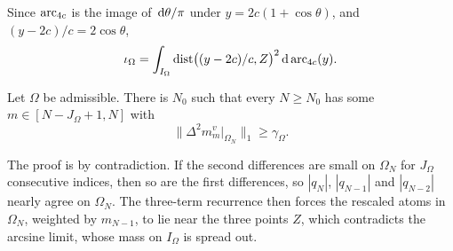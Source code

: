 Since $\operatorname{arc}_{4c}$ is the image of $\,\mathrm{d}\theta/\pi$ under $y=2c(1+\cos\theta)$, and $(y-2c)/c=2\cos\theta$,
\begin{equation}\label{eq:iota-arc}
  \iota_\Omega=\int_{I_\Omega}\operatorname{dist}\bigl((y-2c)/c,Z\bigr)^2\,\mathrm{d}\operatorname{arc}_{4c}(y).
\end{equation}

\begin{lemma}\label{lem:window}
Let $\Omega$ be admissible. There is $N_0$ such that every $N\ge N_0$ has some $m\in[N-J_\Omega+1,N]$ with
\[
  \bigl\|\Delta^2m^v_m|_{\Omega_N}\bigr\|_1\ge\gamma_\Omega .
\]
\end{lemma}

The proof is by contradiction. If the second differences are small on $\Omega_N$ for $J_\Omega$ consecutive indices, then so are
the first differences, so $|q_N|$, $|q_{N-1}|$ and $|q_{N-2}|$ nearly agree on $\Omega_N$. The three-term recurrence then
forces the rescaled atoms in $\Omega_N$, weighted by $m_{N-1}$, to lie near the three points $Z$, which contradicts the
arcsine limit, whose mass on $I_\Omega$ is spread out.


